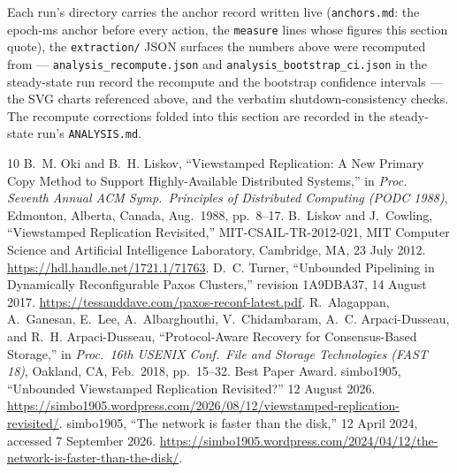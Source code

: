 \documentclass[10pt,journal,letterpaper]{IEEEtran}
\newcommand{\code}[1]{\texttt{\small #1}}
\begin{document}
Each run's directory carries the anchor record written live
(\code{anchors.md}: the epoch-ms anchor before every action, the
\code{measure} lines whose figures this section quote), the
\code{extraction/} JSON surfaces the numbers above were recomputed
from --- \code{analysis\_recompute.json} and
\code{analysis\_bootstrap\_ci.json} in the steady-state run record
the recompute and the bootstrap confidence intervals --- the SVG
charts referenced above, and the verbatim shutdown-consistency
checks. The recompute corrections folded into this section are
recorded in the steady-state run's \code{ANALYSIS.md}.

\begin{thebibliography}{10}
 B.~M. Oki and B.~H. Liskov, ``Viewstamped Replication: A New
Primary Copy Method to Support Highly-Available Distributed Systems,'' in
\emph{Proc. Seventh Annual ACM Symp.\ Principles of Distributed Computing
(PODC 1988)}, Edmonton, Alberta, Canada, Aug.\ 1988, pp.~8--17.
 B.~Liskov and J.~Cowling, ``Viewstamped Replication
Revisited,'' MIT-CSAIL-TR-2012-021, MIT Computer Science and Artificial
Intelligence Laboratory, Cambridge, MA, 23 July 2012.
\url{https://hdl.handle.net/1721.1/71763}.
 D.~C. Turner, ``Unbounded Pipelining in Dynamically
Reconfigurable Paxos Clusters,'' revision 1A9DBA37, 14 August 2017.
\url{https://tessanddave.com/paxos-reconf-latest.pdf}.
 R.~Alagappan, A.~Ganesan, E.~Lee, A.~Albarghouthi,
V.~Chidambaram, A.~C. Arpaci-Dusseau, and R.~H. Arpaci-Dusseau,
``Protocol-Aware Recovery for Consensus-Based Storage,'' in \emph{Proc.\
16th USENIX Conf.\ File and Storage Technologies (FAST 18)}, Oakland, CA,
Feb.\ 2018, pp.~15--32. Best Paper Award.
 simbo1905, ``Unbounded Viewstamped Replication Revisited?''
12 August 2026.
\url{https://simbo1905.wordpress.com/2026/08/12/viewstamped-replication-revisited/}.
\bibitem{netdisk} simbo1905, ``The network is faster than the disk,'' 12 April
2024, accessed 7 September 2026.
\url{https://simbo1905.wordpress.com/2024/04/12/the-network-is-faster-than-the-disk/}.
\end{thebibliography}
\end{document}
